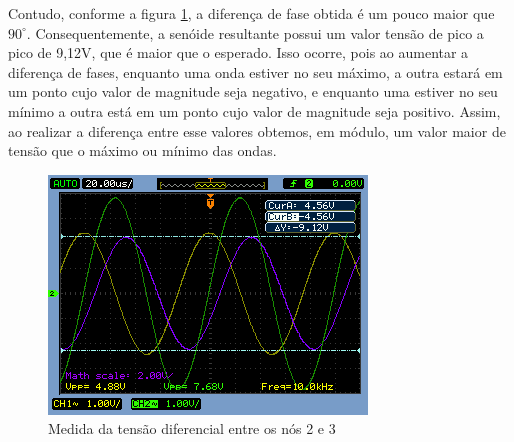 \documentclass[a4paper]{article} %
\begin{document}
Contudo, conforme a figura \ref{fig:Fig-45}, a diferença de fase obtida é um pouco maior que $90^{\circ}$. Consequentemente, a senóide resultante possui um valor tensão de pico a pico de 9,12V, que é maior que o esperado. %
 Isso ocorre, pois ao aumentar a diferença de fases, enquanto uma onda estiver no seu máximo, a outra estará em um ponto cujo valor de magnitude seja negativo, e enquanto uma estiver no seu mínimo a outra está em um ponto cujo valor de magnitude seja positivo. Assim, ao realizar a diferença entre esse valores obtemos, em módulo, um valor maior de tensão que o máximo ou mínimo das ondas.


\begin{figure}[h!]
\begin{centering}
\includegraphics[scale=0.7]{Imagens/45} \caption{Medida da tensão diferencial entre os nós 2 e 3 \label{fig:Fig-45}}
\par\end{centering}
\end{figure}

\end{document}
